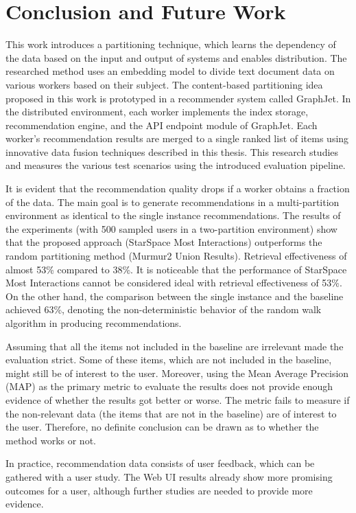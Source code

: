 \chapter{Conclusion and Future Work}
\label{chap:conclusion}
This work introduces a partitioning technique, which learns the dependency of the data based on the input and output of systems and enables distribution. The researched method uses an embedding model to divide text document data on various workers based on their subject. The content-based partitioning idea proposed in this work is prototyped in a recommender system called GraphJet. In the distributed environment, each worker implements the index storage, recommendation engine, and the API endpoint module of GraphJet. Each worker's recommendation results are merged to a single ranked list of items using innovative data fusion techniques described in this thesis. This research studies and measures the various test scenarios using the introduced evaluation pipeline.


It is evident that the recommendation quality drops if a worker obtains a fraction of the data. The main goal is to generate recommendations in a multi-partition environment as identical to the single instance recommendations. The results of the experiments (with 500 sampled users in a two-partition environment) show that the proposed approach (StarSpace Most Interactions) outperforms the random partitioning method (Murmur2 Union Results). Retrieval effectiveness of almost 53\% compared to 38\%. It is noticeable that the performance of StarSpace Most Interactions cannot be considered ideal with retrieval effectiveness of 53\%. On the other hand, the comparison between the single instance and the baseline achieved 63\%, denoting the non-deterministic behavior of the random walk algorithm in producing recommendations.


Assuming that all the items not included in the baseline are irrelevant made the evaluation strict. Some of these items, which are not included in the baseline, might still be of interest to the user. Moreover, using the Mean Average Precision (MAP) as the primary metric to evaluate the results does not provide enough evidence of whether the results got better or worse. The metric fails to measure if the non-relevant data (the items that are not in the baseline) are of interest to the user. Therefore, no definite conclusion can be drawn as to whether the method works or not. 


In practice, recommendation data consists of user feedback, which can be gathered with a user study. The Web UI results already show more promising outcomes for a user, although further studies are needed to provide more evidence. 


